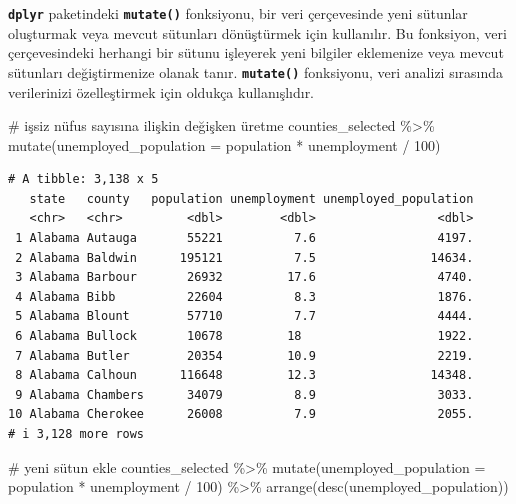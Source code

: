 \documentclass[
  letterpaper,
  DIV=11,
  numbers=noendperiod]{scrreprt}
\newenvironment{Shaded}{\begin{snugshade}}{\end{snugshade}}
\newcommand{\AttributeTok}[1]{\textcolor[rgb]{0.40,0.45,0.13}{#1}}
\newcommand{\CommentTok}[1]{\textcolor[rgb]{0.37,0.37,0.37}{#1}}
\newcommand{\DecValTok}[1]{\textcolor[rgb]{0.68,0.00,0.00}{#1}}
\newcommand{\FunctionTok}[1]{\textcolor[rgb]{0.28,0.35,0.67}{#1}}
\newcommand{\NormalTok}[1]{\textcolor[rgb]{0.00,0.23,0.31}{#1}}
\newcommand{\SpecialCharTok}[1]{\textcolor[rgb]{0.37,0.37,0.37}{#1}}
\begin{document}

\textbf{\texttt{dplyr}} paketindeki \textbf{\texttt{mutate()}}
fonksiyonu, bir veri çerçevesinde yeni sütunlar oluşturmak veya mevcut
sütunları dönüştürmek için kullanılır. Bu fonksiyon, veri çerçevesindeki
herhangi bir sütunu işleyerek yeni bilgiler eklemenize veya mevcut
sütunları değiştirmenize olanak tanır. \textbf{\texttt{mutate()}}
fonksiyonu, veri analizi sırasında verilerinizi özelleştirmek için
oldukça kullanışlıdır.

\begin{Shaded}
\begin{Highlighting}[]
\CommentTok{\# işsiz nüfus sayısına ilişkin değişken üretme}
\NormalTok{counties\_selected }\SpecialCharTok{\%\textgreater{}\%}
\FunctionTok{mutate}\NormalTok{(}\AttributeTok{unemployed\_population =}\NormalTok{ population }\SpecialCharTok{*}\NormalTok{ unemployment }\SpecialCharTok{/} \DecValTok{100}\NormalTok{)}
\end{Highlighting}
\end{Shaded}

\begin{verbatim}
# A tibble: 3,138 x 5
   state   county   population unemployment unemployed_population
   <chr>   <chr>         <dbl>        <dbl>                 <dbl>
 1 Alabama Autauga       55221          7.6                 4197.
 2 Alabama Baldwin      195121          7.5                14634.
 3 Alabama Barbour       26932         17.6                 4740.
 4 Alabama Bibb          22604          8.3                 1876.
 5 Alabama Blount        57710          7.7                 4444.
 6 Alabama Bullock       10678         18                   1922.
 7 Alabama Butler        20354         10.9                 2219.
 8 Alabama Calhoun      116648         12.3                14348.
 9 Alabama Chambers      34079          8.9                 3033.
10 Alabama Cherokee      26008          7.9                 2055.
# i 3,128 more rows
\end{verbatim}

\begin{Shaded}
\begin{Highlighting}[]
\CommentTok{\# yeni sütun ekle}
\NormalTok{counties\_selected }\SpecialCharTok{\%\textgreater{}\%}
\FunctionTok{mutate}\NormalTok{(}\AttributeTok{unemployed\_population =}\NormalTok{ population }\SpecialCharTok{*}\NormalTok{ unemployment }\SpecialCharTok{/} \DecValTok{100}\NormalTok{) }\SpecialCharTok{\%\textgreater{}\%}
\FunctionTok{arrange}\NormalTok{(}\FunctionTok{desc}\NormalTok{(unemployed\_population))}
\end{Highlighting}
\end{Shaded}
\end{document}
